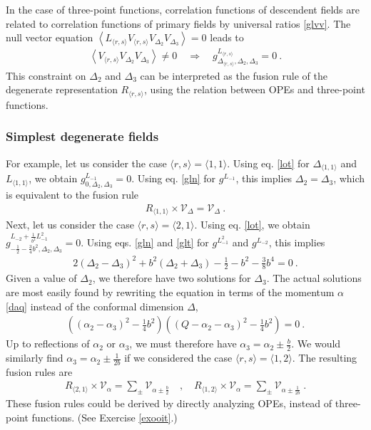 \documentclass[12pt, a4paper, notitlepage, twoside]{report}
\numberwithin{equation}{section}
\theoremstyle{break}
\begin{document}
In the case of three-point functions, correlation functions of descendent fields are related to correlation functions of primary fields by universal ratios \eqref{glvv}. The null vector equation $\left< L_{\langle r,s \rangle} V_{\langle r,s \rangle} V_{\Delta_2}V_{\Delta_3}\right>=0$ leads to
\begin{align}
 \left< V_{\langle r,s \rangle} V_{\Delta_2}V_{\Delta_3}\right>\neq 0 \quad \Rightarrow \quad g^{L_{\langle r,s \rangle}}_{\Delta_{\langle r,s \rangle},\Delta_2,\Delta_3} = 0 \ .
\end{align}
This constraint on $\Delta_2$ and $\Delta_3$ can be interpreted as the fusion rule of the degenerate representation $R_{\langle r,s \rangle}$, using the relation between OPEs and three-point functions.

\subsubsection{Simplest degenerate fields}

For example, let us consider the case $\langle r,s \rangle = \langle 1,1 \rangle$.
Using eq. \eqref{lot} for $\Delta_{\langle 1,1 \rangle}$ and $L_{\langle 1,1 \rangle}$, we obtain
$g^{L_{-1}}_{0,\Delta_2,\Delta_3} = 0$.
Using eq. \eqref{gln} for $g^{L_{-1}}$, this implies 
$
 \Delta_2=\Delta_3
$,
which is equivalent to the fusion rule
\begin{align}
 \boxed{R_{\langle 1,1\rangle} \times \mathcal{V}_\Delta = \mathcal{V}_\Delta} \ .
\end{align}
Next, let us consider the case $\langle r,s \rangle = \langle 2,1 \rangle$.
Using eq. \eqref{lot}, we obtain 
$g^{L_{-2} +\frac{1}{b^2} L_{-1}^2 }_{-\frac12 -\frac34 b^2,\Delta_2,\Delta_3} = 0$.
Using eqs. \eqref{gln} and \eqref{glt} for $g^{L_{-1}^2}$ and $g^{L_{-2}}$, this implies
\begin{align}
 2(\Delta_2-\Delta_3)^2 + b^2 (\Delta_2+\Delta_3) - \frac12 - b^2 -\frac38 b^4= 0\ .
\end{align}
Given a value of $\Delta_2$, we therefore have two solutions for $\Delta_3$.
The actual solutions are most easily found by rewriting the equation in terms of the momentum $\alpha$ \eqref{daq} instead of the conformal dimension $\Delta$,
\begin{align}
 \left((\alpha_2-\alpha_3)^2 -\frac14 b^2\right)\left((Q-\alpha_2-\alpha_3)^2 -\frac14 b^2\right) = 0\ .
\end{align}
Up to reflections of $\alpha_2$ or $\alpha_3$, we must therefore have
$
 \alpha_3 = \alpha_2 \pm \frac{b}{2}
$.
We would similarly find $\alpha_3 = \alpha_2 \pm \frac{1}{2b}$ if we considered the case $\langle r,s\rangle = \langle 1,2\rangle$. 
The resulting fusion rules are 
\begin{align}
\boxed{ R_{\langle 2,1 \rangle}\times \mathcal{V}_\alpha = \sum_\pm \mathcal{V}_{\alpha \pm \frac{b}{2}} }\quad , \quad 
\boxed{ R_{\langle 1,2 \rangle}\times \mathcal{V}_\alpha = \sum_\pm \mathcal{V}_{\alpha \pm \frac{1}{2b}} }\ .
\label{rot}
\end{align}
These fusion rules could be derived by directly analyzing OPEs, instead of three-point functions. (See Exercise \ref{exooit}.) 
\end{document}
